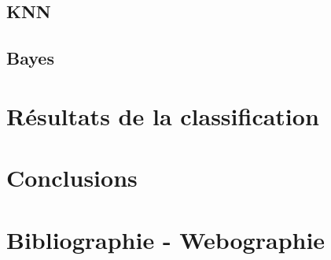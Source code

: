 \documentclass[pdftex,12pt,a4paper]{report}
\begin{document}
\begin{spacing}{1.2}
\section{KNN}

\section{Bayes}

\chapter{Résultats de la classification}

\chapter{Conclusions}

\chapter*{Bibliographie - Webographie}

\end{spacing}
\end{document}
